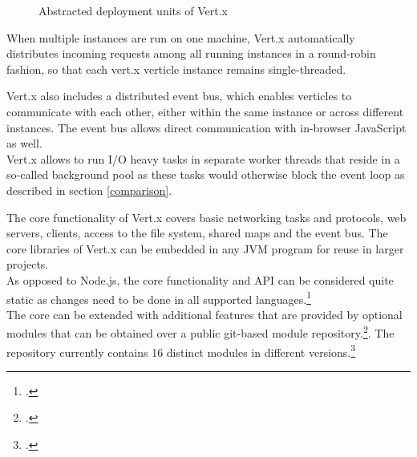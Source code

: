\begin{figure}[h]
	\centering
	\setlength\fboxsep{2pt}
	\caption{Abstracted deployment units of Vert.x}
	\label{fig:vertx_constructs}
\end{figure}

When multiple instances are run on one machine, Vert.x automatically distributes incoming
requests among all running instances in a round-robin fashion, so that each
vert.x verticle instance remains single-threaded.

Vert.x also includes a distributed event bus, which enables verticles to
communicate with each other, either within the same instance or across different
instances. The event bus allows direct communication with in-browser JavaScript as well.\\
Vert.x allows to run I/O heavy tasks in separate worker threads that reside in a
so-called background pool as these tasks would otherwise block the event loop as
described in section \ref{comparison}.

The core functionality of Vert.x covers basic networking tasks and protocols,
web servers, clients, access to the file system, shared maps and the event bus.
The core libraries of Vert.x can be embedded in any JVM program for reuse in
larger projects.\\
As opposed to Node.js, the core functionality and API can be considered quite
static as changes need to be done in all supported
languages.\footcite[Cf.][]{vertx_2012}\\ %
The core can be extended with additional features that are provided by optional
modules that can be obtained over a public git-based module
repository.\footcite[Cf.][]{vertx_mod_2012}.
The repository currently contains 16 distinct modules in different
versions.\footcite[Cf.][]{Vertx_repository_2012}

